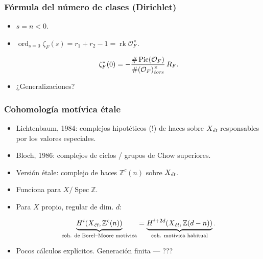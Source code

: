 \documentclass[handout]{beamer}
\newcommand{\FF}{\mathbb{F}}
\newcommand{\ZZ}{\mathbb{Z}}
\DeclareMathOperator{\ord}{ord}
\DeclareMathOperator{\Pic}{Pic}
\DeclareMathOperator{\rk}{rk}
\DeclareMathOperator{\Spec}{Spec}
\newcommand{\et}{\text{\it ét}}
\newcommand{\tors}{\text{\it tors}}
\begin{document}

\begin{frame}
  \frametitle{Fórmula del número de clases (Dirichlet)}

  \begin{itemize}
  \item $s = n < 0$.

  \item $\ord_{s = 0} \zeta_F (s) = r_1 + r_2 - 1 = \rk \mathcal{O}_F^\times$.

    \[ \zeta_F^* (0) = -\frac{\# \Pic (\mathcal{O}_F)}{\# (\mathcal{O}_F)^\times_\tors}\,R_F. \]





  \item ¿Generalizaciones?
  \end{itemize}
\end{frame}


\begin{frame}
  \frametitle{Cohomología motívica étale}

  \begin{itemize}
  \item Lichtenbaum, 1984: complejos hipotéticos (!) de haces sobre $X_\et$
    responsables por los valores especiales.

  \item Bloch, 1986: complejos de ciclos / grupos de Chow superiores.

  \item Versión étale: complejo de haces $\ZZ^c (n)$ sobre $X_\et$.

  \item Funciona para $X / \Spec \ZZ$.

  \item Para $X$ propio, regular de dim. $d$:

    \[ \underbrace{H^i (X_\et, \ZZ^c (n))}_{\text{coh. de Borel--Moore motívica}} = \underbrace{H^{i+2d} (X_\et, \ZZ (d-n))}_{\text{coh. motívica habitual}}. \]

  \item Pocos cálculos explícitos. Generación finita --- ???
  \end{itemize}
\end{frame}
\end{document}
